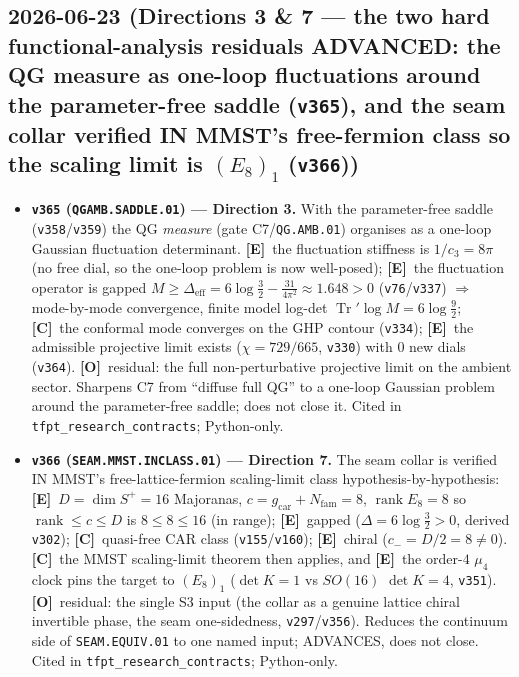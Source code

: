 \documentclass[11pt]{article}
\providecommand{\mE}{\textbf{[E]}}\providecommand{\mC}{\textbf{[C]}}
\providecommand{\mO}{\textbf{[O]}}\providecommand{\mX}{\textbf{[X]}}
\providecommand{\vref}[1]{\texttt{#1}}
\providecommand{\cthree}{c_3}\providecommand{\phiz}{\varphi_0^{\mathrm{ret}}}
\providecommand{\gcar}{g_{\mathrm{car}}}\providecommand{\Nfam}{N_{\mathrm{fam}}}
\begin{document}
\subsection*{2026-06-23 (Directions 3 \& 7 --- the two hard functional-analysis residuals ADVANCED: the QG measure as one-loop fluctuations around the parameter-free saddle (\texttt{v365}), and the seam collar verified IN MMST's free-fermion class so the scaling limit is $(E_8)_1$ (\texttt{v366}))}
\begin{itemize}
\item \textbf{\texttt{v365} (\texttt{QGAMB.SADDLE.01}) --- Direction 3.} With the parameter-free saddle
(\vref{v358}/\vref{v359}) the QG \emph{measure} (gate C7/\texttt{QG.AMB.01}) organises as a one-loop Gaussian
fluctuation determinant. \mE\ the fluctuation stiffness is $1/\cthree=8\pi$ (no free dial, so the one-loop
problem is now well-posed); \mE\ the fluctuation operator is gapped
$M\ge\Delta_{\mathrm{eff}}=6\log\tfrac32-\tfrac{31}{4\pi^2}\approx1.648>0$ (\vref{v76}/\vref{v337}) $\Rightarrow$
mode-by-mode convergence, finite model log-det $\operatorname{Tr}'\log M=6\log\tfrac92$; \mC\ the conformal mode
converges on the GHP contour (\vref{v334}); \mE\ the admissible projective limit exists ($\chi=729/665$,
\vref{v330}) with $0$ new dials (\vref{v364}). \mO\ residual: the full non-perturbative projective limit on the
ambient sector. Sharpens C7 from ``diffuse full QG'' to a one-loop Gaussian problem around the parameter-free
saddle; does not close it. Cited in \texttt{tfpt\_research\_contracts}; Python-only.
\item \textbf{\texttt{v366} (\texttt{SEAM.MMST.INCLASS.01}) --- Direction 7.} The seam collar is verified IN
MMST's free-lattice-fermion scaling-limit class hypothesis-by-hypothesis: \mE\ $D{=}\dim S^+{=}16$ Majoranas,
$c{=}\gcar{+}\Nfam{=}8$, $\operatorname{rank}E_8{=}8$ so $\operatorname{rank}\le c\le D$ is $8\le8\le16$ (in
range); \mE\ gapped ($\Delta{=}6\log\tfrac32{>}0$, derived \vref{v302}); \mC\ quasi-free CAR class
(\vref{v155}/\vref{v160}); \mE\ chiral ($c_-{=}D/2{=}8\neq0$). \mC\ the MMST scaling-limit theorem then applies,
and \mE\ the order-$4$ $\mu_4$ clock pins the target to $(E_8)_1$ ($\det K{=}1$ vs $SO(16)$ $\det K{=}4$,
\vref{v351}). \mO\ residual: the single S3 input (the collar as a genuine lattice chiral invertible phase, the
seam one-sidedness, \vref{v297}/\vref{v356}). Reduces the continuum side of \texttt{SEAM.EQUIV.01} to one named
input; ADVANCES, does not close. Cited in \texttt{tfpt\_research\_contracts}; Python-only.
\end{itemize}
\end{document}
